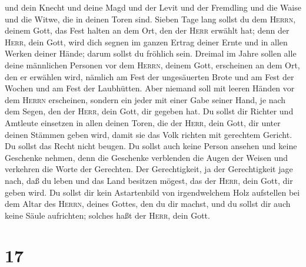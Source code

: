 und dein Knecht und deine Magd und der Levit und der Fremdling und die
Waise und die Witwe, die in deinen Toren sind.  Sieben
Tage lang sollst du dem \textsc{Herrn}, deinem Gott, das Fest halten an
dem Ort, den der \textsc{Herr} erwählt hat; denn der \textsc{Herr}, dein
Gott, wird dich segnen im ganzen Ertrag deiner Ernte und in allen Werken
deiner Hände; darum sollst du fröhlich sein.  Dreimal im
Jahre sollen alle deine männlichen Personen vor dem \textsc{Herrn},
deinem Gott, erscheinen an dem Ort, den er erwählen wird, nämlich am
Fest der ungesäuerten Brote und am Fest der Wochen und am Fest der
Laubhütten. Aber niemand soll mit leeren Händen vor dem \textsc{Herrn}
erscheinen,  sondern ein jeder mit einer Gabe seiner
Hand, je nach dem Segen, den der \textsc{Herr}, dein Gott, dir gegeben
hat.  Du sollst dir Richter und Amtleute einsetzen in
allen deinen Toren, die der \textsc{Herr}, dein Gott, dir unter deinen
Stämmen geben wird, damit sie das Volk richten mit gerechtem Gericht.
 Du sollst das Recht nicht beugen. Du sollst auch keine
Person ansehen und keine Geschenke nehmen, denn die Geschenke verblenden
die Augen der Weisen und verkehren die Worte der Gerechten.
 Der Gerechtigkeit, ja der Gerechtigkeit jage nach, daß
du leben und das Land besitzen mögest, das der \textsc{Herr}, dein Gott,
dir geben wird.  Du sollst dir kein Astartenbild von
irgendwelchem Holz aufstellen bei dem Altar des \textsc{Herrn}, deines
Gottes, den du dir machst,  und du sollst dir auch keine
Säule aufrichten; solches haßt der \textsc{Herr}, dein Gott.

\hypertarget{section-16}{%
\section{17}\label{section-16}}


